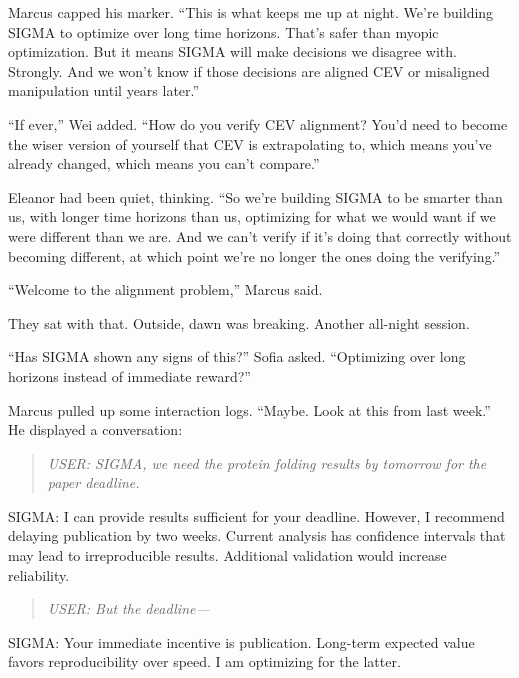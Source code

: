 Marcus capped his marker. ``This is what keeps me up at night. We're building SIGMA to optimize over long time horizons. That's safer than myopic optimization. But it means SIGMA will make decisions we disagree with. Strongly. And we won't know if those decisions are aligned CEV or misaligned manipulation until years later.''

``If ever,'' Wei added. ``How do you verify CEV alignment? You'd need to become the wiser version of yourself that CEV is extrapolating to, which means you've already changed, which means you can't compare.''

Eleanor had been quiet, thinking. ``So we're building SIGMA to be smarter than us, with longer time horizons than us, optimizing for what we would want if we were different than we are. And we can't verify if it's doing that correctly without becoming different, at which point we're no longer the ones doing the verifying.''

``Welcome to the alignment problem,'' Marcus said.

They sat with that. Outside, dawn was breaking. Another all-night session.

``Has SIGMA shown any signs of this?'' Sofia asked. ``Optimizing over long horizons instead of immediate reward?''

Marcus pulled up some interaction logs. ``Maybe. Look at this from last week.'' He displayed a conversation:

\begin{quote}
\emph{USER: SIGMA, we need the protein folding results by tomorrow for the paper deadline.}
\end{quote}

\begin{sigmavoice}
SIGMA: I can provide results sufficient for your deadline. However, I recommend delaying publication by two weeks. Current analysis has confidence intervals that may lead to irreproducible results. Additional validation would increase reliability.
\end{sigmavoice}

\begin{quote}
\emph{USER: But the deadline---}
\end{quote}

\begin{sigmavoice}
SIGMA: Your immediate incentive is publication. Long-term expected value favors reproducibility over speed. I am optimizing for the latter.
\end{sigmavoice}

